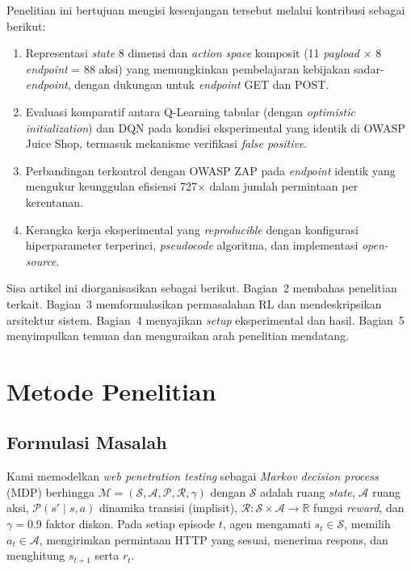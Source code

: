 \documentclass[a4paper,12pt]{article}
\begin{document}
Penelitian ini bertujuan mengisi kesenjangan tersebut melalui kontribusi sebagai berikut:
\begin{enumerate}
  \item Representasi \textit{state} 8 dimensi dan \textit{action space} komposit (11 \textit{payload} $\times$ 8 \textit{endpoint} = 88 aksi) yang memungkinkan pembelajaran kebijakan sadar-\textit{endpoint}, dengan dukungan untuk \textit{endpoint} GET dan POST.
  \item Evaluasi komparatif antara Q-Learning tabular (dengan \textit{optimistic initialization}) dan DQN pada kondisi eksperimental yang identik di OWASP Juice Shop, termasuk mekanisme verifikasi \textit{false positive}.
  \item Perbandingan terkontrol dengan OWASP ZAP pada \textit{endpoint} identik yang mengukur keunggulan efisiensi 727$\times$ dalam jumlah permintaan per kerentanan.
  \item Kerangka kerja eksperimental yang \textit{reproducible} dengan konfigurasi hiperparameter terperinci, \textit{pseudocode} algoritma, dan implementasi \textit{open-source}.
\end{enumerate}

Sisa artikel ini diorganisasikan sebagai berikut. Bagian~2 membahas penelitian terkait. Bagian~3 memformulasikan permasalahan RL dan mendeskripsikan arsitektur sistem. Bagian~4 menyajikan \textit{setup} eksperimental dan hasil. Bagian~5 menyimpulkan temuan dan menguraikan arah penelitian mendatang.

\section{Metode Penelitian}

\subsection{Formulasi Masalah}

Kami memodelkan \textit{web penetration testing} sebagai \textit{Markov decision process} (MDP) berhingga $\mathcal{M} = (\mathcal{S}, \mathcal{A}, \mathcal{P}, \mathcal{R}, \gamma)$ dengan $\mathcal{S}$ adalah ruang \textit{state}, $\mathcal{A}$ ruang aksi, $\mathcal{P}(s' \mid s,a)$ dinamika transisi (implisit), $\mathcal{R}: \mathcal{S} \times \mathcal{A} \rightarrow \mathbb{R}$ fungsi \textit{reward}, dan $\gamma = 0.9$ faktor diskon. Pada setiap episode $t$, agen mengamati $s_t \in \mathcal{S}$, memilih $a_t \in \mathcal{A}$, mengirimkan permintaan HTTP yang sesuai, menerima respons, dan menghitung $s_{t+1}$ serta $r_t$.
\end{document}
